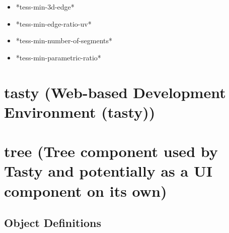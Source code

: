 \documentclass [11pt]{book}
\begin{document}
\begin{itemize}
\item {}*tess-min-3d-edge*





\item {}*tess-min-edge-ratio-uv*





\item {}*tess-min-number-of-segments*





\item {}*tess-min-parametric-ratio*





\end{itemize}





\section{tasty (Web-based Development Environment (tasty))}

\label{sec:tasty(web-baseddevelopmentenvironment(tasty))}







\section{tree (Tree component used by Tasty and potentially as a UI component on its own)}

\label{sec:tree(treecomponentusedbytastyandpotentiallyasauicomponentonitsown)}





\subsection{Object Definitions}

\label{subsec:objectdefinitions}
\end{document}
